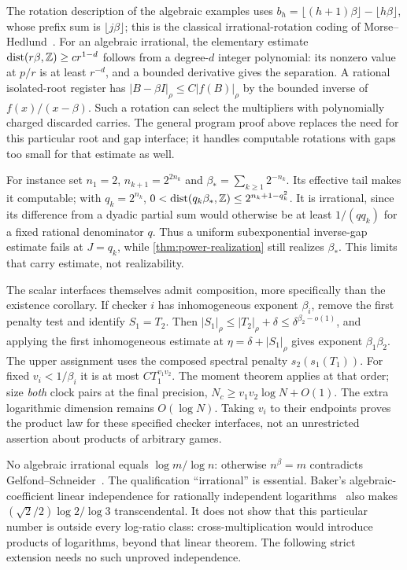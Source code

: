 The rotation description of the algebraic examples uses $b_h=\lfloor(h+1)\beta\rfloor-\lfloor h\beta\rfloor$, whose prefix sum is $\lfloor j\beta\rfloor$; this is the classical irrational-rotation coding of Morse--Hedlund~\cite{MH40}. For an algebraic irrational, the elementary estimate $\operatorname{dist}(r\beta,\mathbb Z)\ge c r^{1-d}$ follows from a degree-$d$ integer polynomial: its nonzero value at $p/r$ is at least $r^{-d}$, and a bounded derivative gives the separation. A rational isolated-root register has $|B-\beta I|_\rho\le C|f(B)|_\rho$ by the bounded inverse of $f(x)/(x-\beta)$. Such a rotation can select the multipliers with polynomially charged discarded carries. The general program proof above replaces the need for this particular root and gap interface; it handles computable rotations with gaps too small for that estimate as well.

For instance set $n_1=2$, $n_{k+1}=2^{2n_k}$ and $\beta_*=\sum_{k\ge1}2^{-n_k}$. Its effective tail makes it computable; with $q_k=2^{n_k}$,
$0<\operatorname{dist}(q_k\beta_*,\mathbb Z)\le2^{n_k+1-q_k^2}$. It is irrational, since its difference from a dyadic partial sum would otherwise be at least $1/(q q_k)$ for a fixed rational denominator $q$. Thus a uniform subexponential inverse-gap estimate fails at $J=q_k$, while \cref{thm:power-realization} still realizes $\beta_*$. This limits that carry estimate, not realizability.

The scalar interfaces themselves admit composition, more specifically than the existence corollary. If checker $i$ has inhomogeneous exponent $\beta_i$, remove the first penalty test and identify $S_1=T_2$. Then
$|S_1|_\rho\le|T_2|_\rho+\delta\le\delta^{\beta_2-o(1)}$, and applying the first inhomogeneous estimate at $\eta=\delta+|S_1|_\rho$ gives exponent $\beta_1\beta_2$. The upper assignment uses the composed spectral penalty $s_2(s_1(T_1))$. For fixed $v_i<1/\beta_i$ it is at most $CT_1^{v_1v_2}$. The moment theorem applies at that order; size \emph{both} clock pairs at the final precision, $N_c\ge v_1v_2\log N+O(1)$. The extra logarithmic dimension remains $O(\log N)$. Taking $v_i$ to their endpoints proves the product law for these specified checker interfaces, not an unrestricted assertion about products of arbitrary games.

No algebraic irrational equals $\log m/\log n$: otherwise $n^\beta=m$ contradicts Gelfond--Schneider~\cite{Gel34}. The qualification ``irrational'' is essential. Baker's algebraic-coefficient linear independence for rationally independent logarithms~\cite{Bak66} also makes $(\sqrt2/2)\log2/\log3$ transcendental. It does not show that this particular number is outside every log-ratio class: cross-multiplication would introduce products of logarithms, beyond that linear theorem. The following strict extension needs no such unproved independence.

